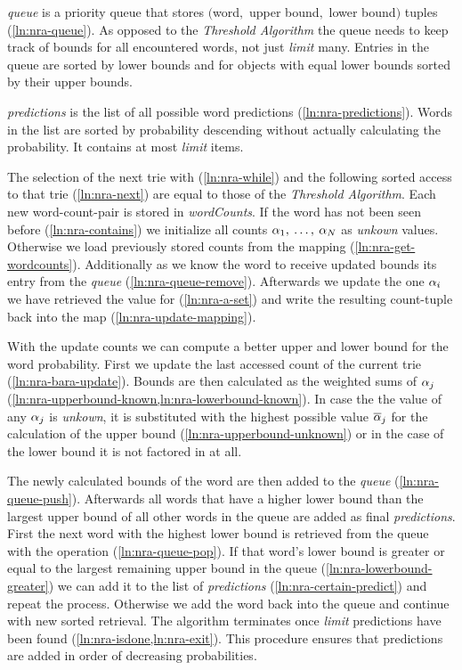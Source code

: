 \emph{queue} is a priority queue that stores $($word$,$ upper
bound$,$ lower bound$)$ tuples (\cref{ln:nra-queue}).
As opposed to the \emph{Threshold Algorithm} the queue needs to keep track of
bounds for all encountered words, not just \emph{limit} many.
Entries in the queue are sorted by lower bounds and for objects with equal
lower bounds sorted by their upper bounds.

\emph{predictions} is the list of all possible word predictions
(\cref{ln:nra-predictions}).
Words in the list are sorted by probability descending without actually
calculating the probability.
It contains at most \emph{limit} items.

The selection of the next trie with  (\cref{ln:nra-while})
and the following sorted access to that trie (\cref{ln:nra-next}) are equal
to those of the \emph{Threshold Algorithm}.
Each new word-count-pair is stored in \emph{wordCounts}.
If the word has not been seen before (\cref{ln:nra-contains}) we initialize all
counts $\alpha_1, \: \ldots, \: \alpha_N$ as \emph{unkown} values.
Otherwise we load previously stored counts from the mapping
(\cref{ln:nra-get-wordcounts}).
Additionally as we know the word to receive updated bounds its entry from the
\emph{queue} (\cref{ln:nra-queue-remove}).
Afterwards we update the one $\alpha_i$ we have retrieved the value for
(\cref{ln:nra-a-set}) and write the resulting count-tuple back into the map
(\cref{ln:nra-update-mapping}).

With the update counts we can compute a better upper and lower bound for the
word probability.
First we update the last accessed count of the current trie
(\cref{ln:nra-bara-update}).
Bounds are then calculated as the weighted sums of $\alpha_j$
(\cref{ln:nra-upperbound-known,ln:nra-lowerbound-known}).
In case the the value of any $\alpha_j$ is \emph{unkown}, it is  substituted
with the highest possible value $\overline{\alpha}_j$ for the calculation of
the upper bound (\cref{ln:nra-upperbound-unknown}) or in the case of the lower
bound it is not factored in at all.

The newly calculated bounds of the word are then added to the \emph{queue}
(\cref{ln:nra-queue-push}).
Afterwards all words that have a higher lower bound than the largest
upper bound of all other words in the queue are added as final
\emph{predictions}.
First the next word with the highest lower bound is retrieved from the queue
with the  operation (\cref{ln:nra-queue-pop}).
If that word's lower bound is greater or equal to the largest remaining upper
bound in the queue (\cref{ln:nra-lowerbound-greater}) we can add it to the list
of \emph{predictions} (\cref{ln:nra-certain-predict}) and repeat the process.
Otherwise we add the word back into the queue and continue with new sorted
retrieval.
The algorithm terminates once \emph{limit} predictions have been found
(\cref{ln:nra-isdone,ln:nra-exit}).
This procedure ensures that predictions are added in order of decreasing
probabilities.

